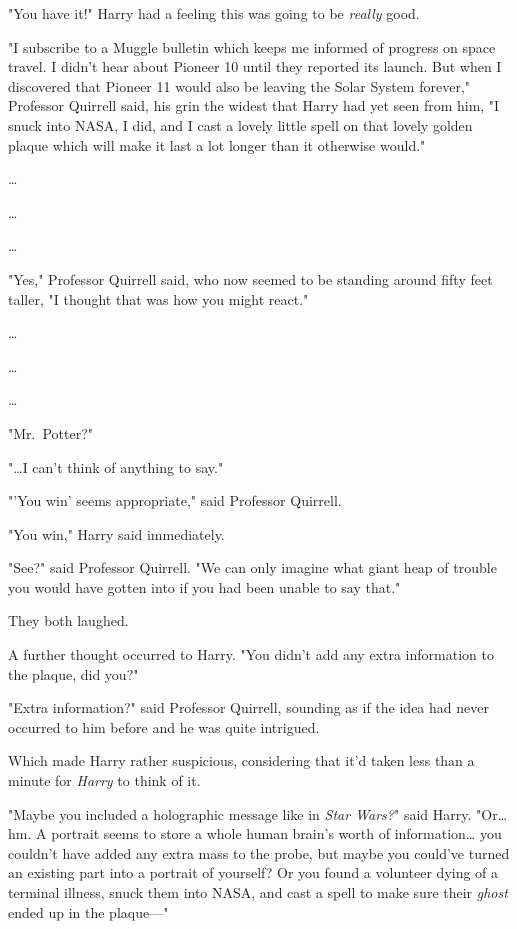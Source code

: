 "You have it!" Harry had a feeling this was going to be \emph{really} good.

"I subscribe to a Muggle bulletin which keeps me informed of progress on space travel. I didn't hear about Pioneer 10 until they reported its launch. But when I discovered that Pioneer 11 would also be leaving the Solar System forever," Professor Quirrell said, his grin the widest that Harry had yet seen from him, "I snuck into NASA, I did, and I cast a lovely little spell on that lovely golden plaque which will make it last a lot longer than it otherwise would."

{\ldots}

{\ldots}

{\ldots}

"Yes," Professor Quirrell said, who now seemed to be standing around fifty feet taller, "I thought that was how you might react."

{\ldots}

{\ldots}

{\ldots}

"Mr.~Potter?"

"{\ldots}I can't think of anything to say."

"'You win' seems appropriate," said Professor Quirrell.

"You win," Harry said immediately.

"See?" said Professor Quirrell. "We can only imagine what giant heap of trouble you would have gotten into if you had been unable to say that."

They both laughed.

A further thought occurred to Harry. "You didn't add any extra information to the plaque, did you?"

"Extra information?" said Professor Quirrell, sounding as if the idea had never occurred to him before and he was quite intrigued.

Which made Harry rather suspicious, considering that it'd taken less than a minute for \emph{Harry} to think of it.

"Maybe you included a holographic message like in \emph{Star Wars?}" said Harry. "Or{\ldots} hm. A portrait seems to store a whole human brain's worth of information{\ldots} you couldn't have added any extra mass to the probe, but maybe you could've turned an existing part into a portrait of yourself? Or you found a volunteer dying of a terminal illness, snuck them into NASA, and cast a spell to make sure their \emph{ghost} ended up in the plaque---"

